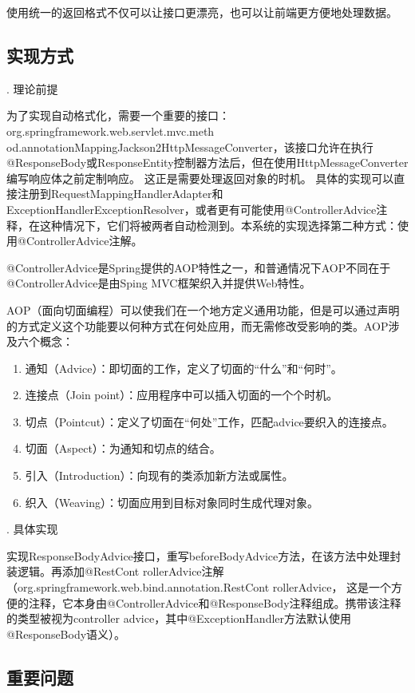 使用统一的返回格式不仅可以让接口更漂亮，也可以让前端更方便地处理数据。

\subsection{实现方式}

. 理论前提

为了实现自动格式化，需要一个重要的接口： org.springframework.web.servlet.mvc.meth od.annotationMappingJackson2HttpMessageConverter，该接口允许在执行@ResponseBody或ResponseEntity控制器方法后，但在使用HttpMessageConverter编写响应体之前定制响应。 这正是需要处理返回对象的时机。
具体的实现可以直接注册到RequestMappingHandlerAdapter和ExceptionHandlerExceptionResolver，或者更有可能使用@ControllerAdvice注释，在这种情况下，它们将被两者自动检测到。本系统的实现选择第二种方式：使用@ControllerAdvice注解。

@ControllerAdvice是Spring提供的AOP特性之一，和普通情况下AOP不同在于@ControllerAdvice是由Sping MVC框架织入并提供Web特性。

AOP（面向切面编程）可以使我们在一个地方定义通用功能，但是可以通过声明的方式定义这个功能要以何种方式在何处应用，而无需修改受影响的类\cite{.SpringInAction}。AOP涉及六个概念：
\begin{enumerate}
  \item 通知（Advice）：即切面的工作，定义了切面的“什么”和“何时”。
  \item 连接点（Join point）：应用程序中可以插入切面的一个个时机。
  \item 切点（Pointcut）：定义了切面在“何处”工作，匹配advice要织入的连接点。
  \item 切面（Aspect）：为通知和切点的结合。
  \item 引入（Introduction）：向现有的类添加新方法或属性。
  \item 织入（Weaving）：切面应用到目标对象同时生成代理对象。
\end{enumerate}

. 具体实现

实现ResponseBodyAdvice接口，重写beforeBodyAdvice方法，在该方法中处理封装逻辑。再添加@RestCont rollerAdvice注解（org.springframework.web.bind.annotation.RestCont rollerAdvice，
这是一个方便的注释，它本身由@ControllerAdvice和@ResponseBody注释组成。携带该注释的类型被视为controller advice，其中@ExceptionHandler方法默认使用@ResponseBody语义）。

\subsection{重要问题}

